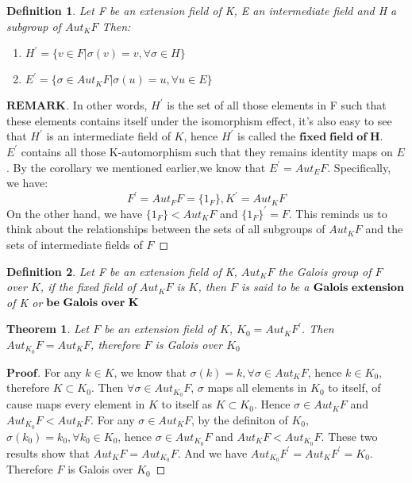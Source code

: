 \documentclass[a4paper, 11pt]{article}
\newtheorem{difinition}{Definition}
\newtheorem{theorem}{Theorem}
\theoremstyle{remark}
\newenvironment{myremark}
{\renewcommand\qedsymbol{$ $}\begin{proof}[$\mathbf{REMARK}$]}
  {\end{proof}}
\newenvironment{myprf}
{\renewcommand\qedsymbol{$ $}\begin{proof}[$\mathbf{Proof}$]}
  {\end{proof}}
\theoremstyle{definition}
\begin{document}
    \vspace{0.5cm}
    \begin{difinition}
            Let F be an extension field of K, E an intermediate field and H a subgroup of 
            $Aut_K F$ Then:
            \begin{enumerate}
                    \item $H^{'}=\{v\in F | \sigma(v)=v, \forall \sigma \in H\}$
                    \item $E^{'}=\{\sigma\in Aut_K F | \sigma(u)=u, \forall u\in E\} $
            \end{enumerate}
    \end{difinition}
    \vspace{0.3cm}
    \begin{myremark}
        In other words, $H^{'}$ is the set of all those elements in F such that these 
        elements contains itself under the isomorphism effect, it's also easy to see that $H^{'}$ is an intermediate field of $K$, hence $H^{'}$ is called the 
        $\mathbf{fixed\; field\; of\; H}$.\\
        \indent $E^{'}$ contains all those K-automorphism such that they remains identity 
        maps on $E$. By the corollary we mentioned earlier,we know that $E^{'}=Aut_E F$.
        Specifically, we have:
        $$
        F^{'}=Aut_{F}F=\{1_F\}, K^{'}=Aut_{K}F
        $$ On the other hand, we have $\{1_F\} < Aut_{K}F$ and $\{1_F\}^{'}=F$. This 
        reminds us to think about the relationships between the sets of all subgroups of 
        $Aut_K F$ and the sets of intermediate fields of $F$
    \end{myremark}
    \vspace{0.5cm}
    \begin{difinition}
            Let F be an extension field of K, $Aut_K F$ the Galois group of $F$ over $K$,
            if the fixed field of $Aut_{K}F$ is $K$, then $F$ is said to be a $\textbf{Galois\;extension}$ of K or $\textbf{be\;Galois\;over\;K}$
            
    \end{difinition}
    \vspace{0.5cm}
    \begin{theorem}
            Let $F$ be an extension field of $K$, $K_0=Aut_K F^{'}$. Then $Aut_{K_0}F=Aut_{K} F$, therefore $F$ is Galois over $K_0$
    \end{theorem}
    \vspace{0.3cm}
    \begin{myprf}
        For any $k\in K$, we know that $\sigma(k)=k,\forall \sigma\in Aut_{K}F$, hence 
        $k\in K_0$, therefore $K\subset K_0$. Then $\forall \sigma \in Aut_{K_0}F$, $\sigma$
        maps all elements in $K_0$ to itself, of cause maps every element in $K$ to itself
        as $K\subset K_0$. Hence $\sigma \in Aut_{K}F$ and $Aut_{K_0}F<Aut_{K}F$. For 
        any $\sigma \in Aut_{K}F$, by the definiton of $K_0$, $\sigma(k_0)=k_0,\forall k_0 \in K_0$, hence $\sigma\in Aut_{K_0}F$ and $Aut_{K}F<Aut_{K_0}F$. These two results show
        that $Aut_{K}F=Aut_{K_0}F$. And we have $Aut_{K_0}F^{'}=Aut_{K}F^{'}=K_0$. 
        Therefore $F$ is Galois over $K_0$
    \end{myprf}
    
\end{document}
